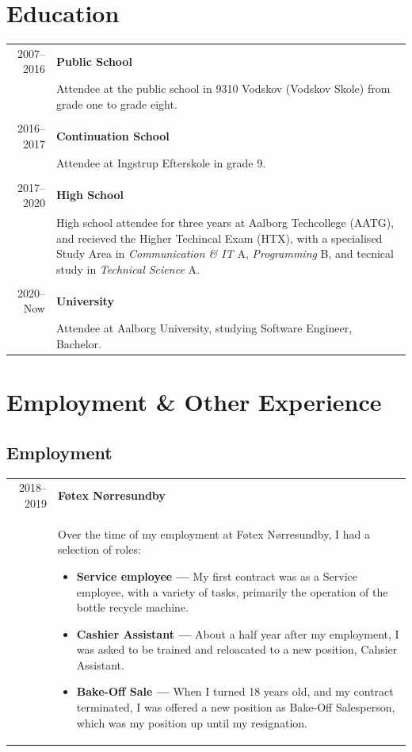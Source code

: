 \documentclass{article}
\begin{document}
    \section*{Education}
    \begin{tabular}{r|p{.82\linewidth}} 
        2007--2016 & \textbf{Public School}\\
    &   Attendee at the public school in 9310 Vodskov (Vodskov Skole) from grade one to grade eight.
        \\\\
        2016--2017 & \textbf{Continuation School}\\
    &   Attendee at Ingstrup Efterskole in grade 9.
        \\\\
        2017--2020 & \textbf{High School}\\
    &   High school attendee for three years at Aalborg Techcollege (AATG), and recieved the Higher
            Techincal Exam (HTX), with a specialised Study Area in \textit{Communication \& IT} A,
            \textit{Programming} B, and tecnical study in \textit{Technical Science} A.
        \\\\
        2020--Now & \textbf{University}\\
    &   Attendee at Aalborg University, studying Software Engineer, Bachelor.
    \end{tabular}
 
    \section*{Employment \& Other Experience}
    \subsection*{Employment}
    \begin{tabular}{r|p{.82\linewidth}}%
        2018--2019 & \textbf{Føtex Nørresundby}\\
    &   Over the time of my employment at Føtex Nørresundby, I had a selection of roles:
        \begin{itemize}\setlength\itemsep{0em}
            \item[] \textbf{Service employee --- } My first contract was as a Service employee,
                with a variety of tasks, primarily the operation of the bottle recycle machine.
            \item[] \textbf{Cashier Assistant --- } About a half year after my employment,
                I was asked to be trained and reloacated to a new position, Cahsier Assistant.
            \item[] \textbf{Bake-Off Sale --- } When I turned 18 years old, and my contract
                terminated, I was offered a new position as Bake-Off Salesperson, which was my
                position up until my resignation.

        \end{itemize}
    \end{tabular}
\end{document}
